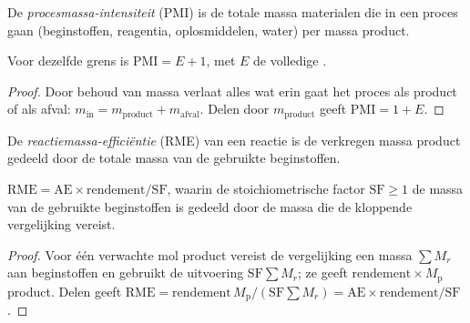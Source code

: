 \begin{definition}\label{def:b3:green-industrial:pmi}
De \emph{procesmassa-intensiteit} (PMI) is
de totale massa materialen die in een proces gaan (beginstoffen,
reagentia, oplosmiddelen, water) per massa product.
\end{definition}

\begin{proposition}\label{prop:b3:green-industrial:pmi-e}
Voor dezelfde grens is $\mathrm{PMI} = E + 1$, met $E$ de volledige .
\end{proposition}

\begin{proof}
Door behoud van massa verlaat alles wat erin gaat het proces als product
of als afval:
$m_{\mathrm{in}} = m_{\mathrm{product}} + m_{\mathrm{afval}}$. Delen door $m_{\mathrm{product}}$ geeft $\mathrm{PMI} = 1 + E$.
\end{proof}

\begin{definition}\label{def:b3:green-industrial:rme}
De \emph{reactiemassa-efficiëntie}
(RME) van een reactie is de verkregen massa product gedeeld door de
totale massa van de gebruikte beginstoffen.
\end{definition}

\begin{proposition}\label{prop:b3:green-industrial:rme}
$\mathrm{RME} = \mathrm{AE} \times \text{rendement}/\mathrm{SF}$, waarin de stoichiometrische factor $\mathrm{SF} \ge 1$ de massa van de
gebruikte beginstoffen is gedeeld door de massa die de kloppende
vergelijking vereist.
\end{proposition}

\begin{proof}
Voor één verwachte mol product vereist de vergelijking een massa $\sum M_r$ aan beginstoffen en
gebruikt de uitvoering $\mathrm{SF}\sum M_r$; ze geeft $\text{rendement} \times M_{\mathrm p}$ product. Delen geeft
$\mathrm{RME} = \text{rendement}\,M_{\mathrm p}/(\mathrm{SF}\sum M_r) = \mathrm{AE} \times \text{rendement}/\mathrm{SF}$.
\end{proof}

